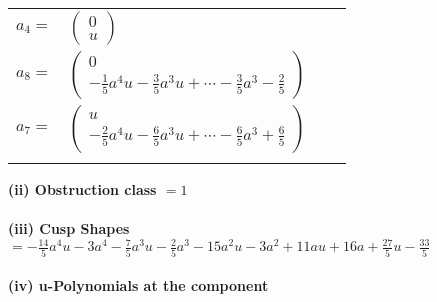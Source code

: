 \documentclass[1p]{elsarticle_modified}
\theoremstyle{definition}
\begin{document}
\begin{tabular}{m{7pt} m{180pt} m{7pt} m{180pt} }
\flushright $a_{4}=$&$\begin{pmatrix}0\\u\end{pmatrix}$ \\
\flushright $a_{8}=$&$\begin{pmatrix}0\\-\frac{1}{5} a^4 u-\frac{3}{5} a^3 u+\cdots-\frac{3}{5} a^3-\frac{2}{5}\end{pmatrix}$ \\
\flushright $a_{7}=$&$\begin{pmatrix}u\\-\frac{2}{5} a^4 u-\frac{6}{5} a^3 u+\cdots-\frac{6}{5} a^3+\frac{6}{5}\end{pmatrix}$\\&\end{tabular}
\flushleft \textbf{(ii) Obstruction class $= 1$}\\~\\
\flushleft \textbf{(iii) Cusp Shapes $= -\frac{14}{5} a^4 u-3 a^4-\frac{7}{5} a^3 u-\frac{2}{5} a^3-15 a^2 u-3 a^2+11 a u+16 a+\frac{27}{5} u-\frac{33}{5}$}\\~\\
\newpage\renewcommand{\arraystretch}{1}
\flushleft \textbf{(iv) u-Polynomials at the component}\newline \\
\end{document}
